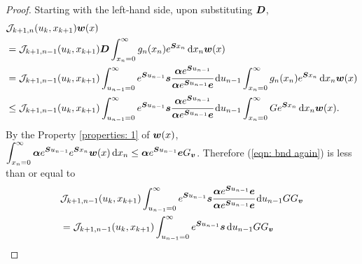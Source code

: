 \begin{proof}
	Starting with the left-hand side, upon substituting \(\boldsymbol{D}\), 
	\begin{align}
		& \mathcal J_{k+1,n}(u_k,x_{k+1})  {\boldsymbol w}(x)  \nonumber 
		\\&= \mathcal J_{k+1,n-1}(u_k,x_{k+1})  \boldsymbol{D}
		\int_{x_n=0}^\infty g_{n}(x_n) e^{\boldsymbol{S}x_n} \, \mathrm{d} x_n{\boldsymbol w}(x) \nonumber
		\\&= \mathcal J_{k+1,n-1}(u_k,x_{k+1})  \int_{u_{n-1}=0}^\infty e^{\boldsymbol{S}u_{n-1}}\boldsymbol s \cfrac{\boldsymbol \alpha e^{\boldsymbol{S}u_{n-1}}}{\boldsymbol \alpha e^{\boldsymbol{S}u_{n-1}}\boldsymbol e}\, \mathrm{d}  u_{n-1}
		\int_{x_n=0}^\infty g_{n}(x_n) e^{\boldsymbol{S}x_n} \, \mathrm{d} x_n{\boldsymbol w}(x) \nonumber
		\\&\leq \mathcal J_{k+1,n-1}(u_k,x_{k+1})  \int_{u_{n-1}=0}^\infty e^{\boldsymbol{S}u_{n-1}}\boldsymbol s \cfrac{\boldsymbol \alpha e^{\boldsymbol{S}u_{n-1}}}{\boldsymbol \alpha e^{\boldsymbol{S}u_{n-1}}\boldsymbol e}\, \mathrm{d}  u_{n-1}
		\int_{x_n=0}^\infty G e^{\boldsymbol{S}x_n} \, \mathrm{d} x_n{\boldsymbol w}(x). \label{eqn: bnd again}
	\end{align}
	By the Property \ref{properties: 1} of \({\boldsymbol w}(x)\), \(\displaystyle\int_{x_n=0}^\infty \boldsymbol \alpha e^{\boldsymbol{S}u_{n-1}}e^{\boldsymbol{S}x_n} {\boldsymbol w}(x) \, \mathrm{d} x_n  \leq \boldsymbol \alpha e^{\boldsymbol{S}u_{n-1}}\boldsymbol eG_{\boldsymbol v}\). Therefore (\ref{eqn: bnd again}) is less than or equal to 
	\begin{align}
		&\mathcal J_{k+1,n-1}(u_k,x_{k+1})  \int_{u_{n-1}=0}^\infty e^{\bs{S}u_{n-1}}\bs s \cfrac{\bs \alpha e^{\bs{S}u_{n-1}}\bs e}{\bs \alpha e^{\bs{S}u_{n-1}}\bs e}\wrt  u_{n-1} G  G_{\bs v}\nonumber 
		\\& = \mathcal J_{k+1,n-1}(u_k,x_{k+1})  \int_{u_{n-1}=0}^\infty e^{\bs{S}u_{n-1}}\bs s \wrt  u_{n-1} G  G_{\bs v}\nonumber

\end{align}
\end{proof}
